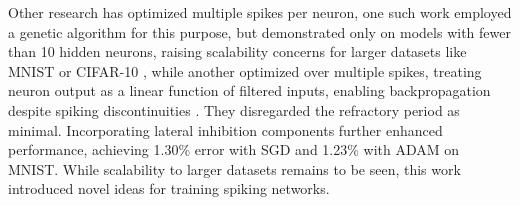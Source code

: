 
\noindent Other research has optimized multiple spikes per neuron, one such work employed a genetic algorithm for this purpose, but demonstrated only on models with fewer than 10 hidden neurons, raising scalability concerns for larger datasets like MNIST or CIFAR-10 \cite{stromatias2015supervised}, while another optimized over multiple spikes, treating neuron output as a linear function of filtered inputs, enabling backpropagation despite spiking discontinuities \cite{lee2016training}. They disregarded the refractory period as minimal. Incorporating lateral inhibition components further enhanced performance, achieving 1.30\% error with SGD and 1.23\% with ADAM on MNIST. While scalability to larger datasets remains to be seen, this work introduced novel ideas for training spiking networks.\\




